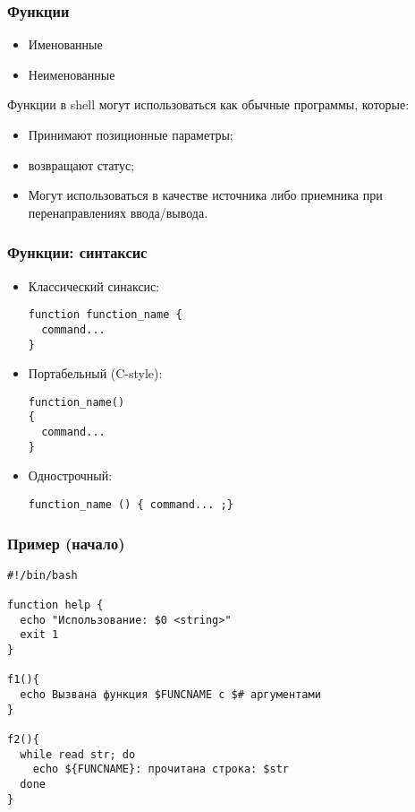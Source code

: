 \begin{frame}
	\frametitle{Функции}

	\begin{itemize}
		\item Именованные
		\item Неименованные
	\end{itemize}

	Функции в shell могут использоваться как обычные программы, которые:
	\begin{itemize}
		\item Принимают позиционные параметры;
		\item возвращают статус;
		\item Могут использоваться в качестве источника либо приемника 
			при перенаправлениях ввода/вывода.
	\end{itemize}

\end{frame}


\begin{frame}[fragile]
	\frametitle{Функции: синтаксис}
	\begin{itemize}
		\item Классический синаксис: 
			\begin{lstlisting}
function function_name {
  command...
} 
			\end{lstlisting}
		\item Портабельный (C-style):
			\begin{lstlisting}
function_name()
{
  command...
} 
			\end{lstlisting}

		\item Однострочный:
			\begin{lstlisting}
function_name () { command... ;}
			\end{lstlisting}
  \end{itemize}
\end{frame}

\begin{frame}[fragile]
	\frametitle{Пример (начало)}
	\small
	\begin{lstlisting}
#!/bin/bash

function help {
  echo "Использование: $0 <string>"
  exit 1
}

f1(){
  echo Вызвана функция $FUNCNAME с $# аргументами
}

f2(){
  while read str; do
    echo ${FUNCNAME}: прочитана строка: $str
  done
}
	\end{lstlisting}

\end{frame}



